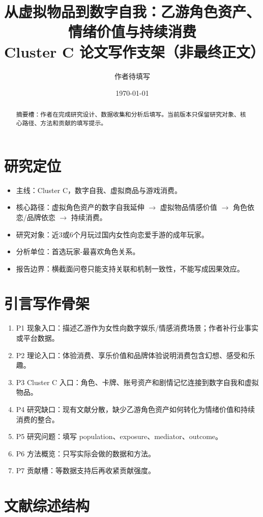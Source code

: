 \documentclass[UTF8,zihao=-4]{ctexart}
\title{从虚拟物品到数字自我：乙游角色资产、情绪价值与持续消费\\{\large Cluster C 论文写作支架（非最终正文）}}
\author{作者待填写}
\date{\today}
\begin{document}
\maketitle
\begin{center}\end{center}
\begin{abstract}
\noindent 摘要槽：作者在完成研究设计、数据收集和分析后填写。当前版本只保留研究对象、核心路径、方法和贡献的填写提示。
\end{abstract}
\section{研究定位}
\begin{itemize}
\item 主线：Cluster C，数字自我、虚拟商品与游戏消费。
\item 核心路径：虚拟角色资产的数字自我延伸 $\rightarrow$ 虚拟物品情感价值 $\rightarrow$ 角色依恋/品牌依恋 $\rightarrow$ 持续消费。
\item 研究对象：近3或6个月玩过国内女性向恋爱手游的成年玩家。
\item 分析单位：首选玩家-最喜欢角色关系。
\item 报告边界：横截面问卷只能支持关联和机制一致性，不能写成因果效应。
\end{itemize}
\section{引言写作骨架}
\begin{enumerate}
\item P1 现象入口：描述乙游作为女性向数字娱乐/情感消费场景；作者补行业事实或平台数据。
\item P2 理论入口：体验消费、享乐价值和品牌体验说明消费包含幻想、感受和乐趣。
\item P3 Cluster C 入口：角色、卡牌、账号资产和剧情记忆连接到数字自我和虚拟物品。
\item P4 研究缺口：现有文献分散，缺少乙游角色资产如何转化为情绪价值和持续消费的整合。
\item P5 研究问题：填写 population、exposure、mediator、outcome。
\item P6 方法概览：只写实际会做的数据和方法。
\item P7 贡献槽：等数据支持后再收紧贡献强度。
\end{enumerate}
\section{文献综述结构}
\end{document}
